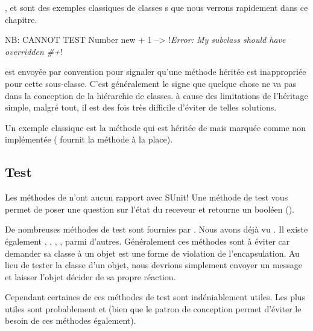 \documentclass[a4paper,10pt,twoside]{book}
\begin{document}
,  et  sont des exemples 
classiques de  classes s que nous verrons rapidement 
dans ce chapitre.

\begin{code}{NB: CANNOT TEST}
Number new + 1 --> !\emph{Error: My subclass should have overridden \#+}!
\end{code}

 est envoyée par convention pour signaler qu'une méthode héritée 
est inappropriée pour cette sous-classe. C'est généralement le signe que quelque chose 
ne va pas dans la conception de la hiérarchie de classes. à cause des limitations de 
l'héritage simple, malgré tout, il est des fois très difficile d'éviter de telles solutions.

Un exemple classique est la méthode  qui est héritée 
de  mais marquée comme non implémentée ( fournit 
la méthode  à la place).



\subsection{Test}

Les méthodes de  n'ont aucun rapport avec SUnit! Une méthode de test vous 
permet de poser une question sur l'état du receveur et retourne un booléen ().

De nombreuses méthodes de test sont fournies par . Nous
avons déjà vu . Il existe également
, ,
, , parmi
d'autres. Généralement ces méthodes sont à éviter car
demander sa classe à un objet est une forme de violation de
l'encapsulation. Au lieu de tester la classe d'un objet, nous devrions
simplement envoyer un message et laisser l'objet décider de sa propre réaction.

Cependant certaines de ces méthodes de test sont indéniablement utiles. Les plus utiles sont probablement  et  (bien que le patron de conception \cite{Wool98a} permet d'éviter le besoin de ces méthodes également).
\end{document}
